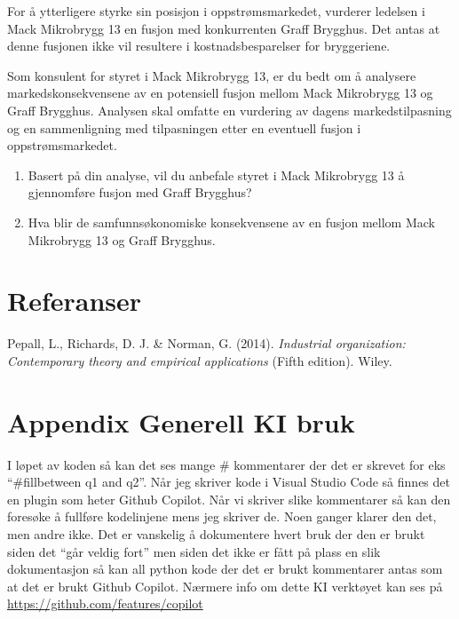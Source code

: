 \documentclass[
  12pt,
  a4paper,
  DIV=11,
  numbers=noendperiod]{scrartcl}
\newlength{\cslhangindent}
\newenvironment{CSLReferences}[2] %
 {\begin{list}{}{%
  \setlength{\itemindent}{0pt}
  \setlength{\leftmargin}{0pt}
  \setlength{\parsep}{0pt}
  \ifodd #1
   \setlength{\leftmargin}{\cslhangindent}
   \setlength{\itemindent}{-1\cslhangindent}
  \fi
  \setlength{\itemsep}{#2\baselineskip}}}
 {\end{list}}
\begin{document}
For å ytterligere styrke sin posisjon i oppstrømsmarkedet, vurderer
ledelsen i Mack Mikrobrygg 13 en fusjon med konkurrenten Graff Brygghus.
Det antas at denne fusjonen ikke vil resultere i kostnadsbesparelser for
bryggeriene.

Som konsulent for styret i Mack Mikrobrygg 13, er du bedt om å analysere
markedskonsekvensene av en potensiell fusjon mellom Mack Mikrobrygg 13
og Graff Brygghus. Analysen skal omfatte en vurdering av dagens
markedstilpasning og en sammenligning med tilpasningen etter en
eventuell fusjon i oppstrømsmarkedet.

\clearpage

\begin{enumerate}
\def\labelenumi{\alph{enumi})}
\setcounter{enumi}{1}
\item
  Basert på din analyse, vil du anbefale styret i Mack Mikrobrygg 13 å
  gjennomføre fusjon med Graff Brygghus?
\item
  Hva blir de samfunnsøkonomiske konsekvensene av en fusjon mellom Mack
  Mikrobrygg 13 og Graff Brygghus.
\end{enumerate}

\clearpage

\section{Referanser}\label{referanser}

\label{refs}
\begin{CSLReferences}{1}{0}
Pepall, L., Richards, D. J. \& Norman, G. (2014). \emph{Industrial
organization: Contemporary theory and empirical applications} (Fifth
edition). Wiley.

\end{CSLReferences}

\clearpage

\appendix

\section {Appendix Generell KI bruk}

I løpet av koden så kan det ses mange \# kommentarer der det er skrevet
for eks ``\#fillbetween q1 and q2''. Når jeg skriver kode i Visual
Studio Code så finnes det en plugin som heter Github Copilot. Når vi
skriver slike kommentarer så kan den foresøke å fullføre kodelinjene
mens jeg skriver de. Noen ganger klarer den det, men andre ikke. Det er
vanskelig å dokumentere hvert bruk der den er brukt siden det ``går
veldig fort'' men siden det ikke er fått på plass en slik dokumentasjon
så kan all python kode der det er brukt kommentarer antas som at det er
brukt Github Copilot. Nærmere info om dette KI verktøyet kan ses på
\url{https://github.com/features/copilot}
\end{document}
